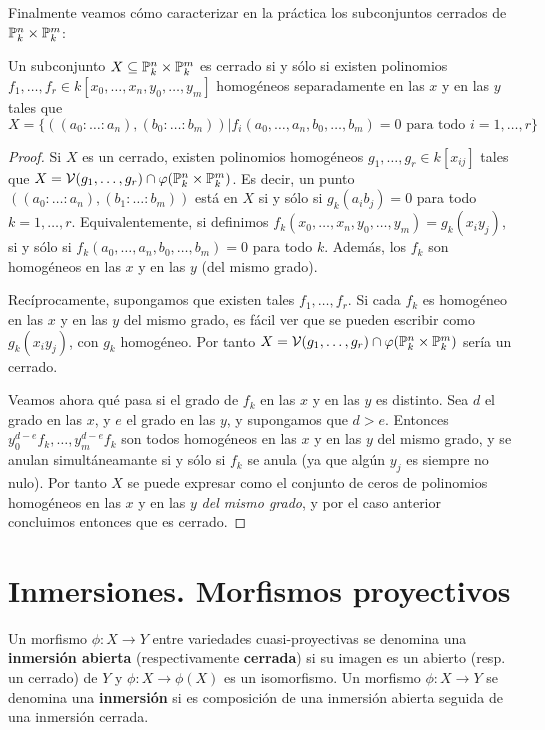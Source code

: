 \documentclass[ACGA.tex]{subfiles}
\begin{document}
Finalmente veamos cómo caracterizar en la práctica los subconjuntos cerrados de $\mathbb{P}^n_k\times\mathbb{P}^m_k$:

\begin{prop}
 Un subconjunto $X\subseteq\mathbb{P}^n_k\times\mathbb{P}^m_k$ es cerrado si y sólo si existen polinomios $f_1,\ldots,f_r\in k[x_0,\ldots,x_n,y_0,\ldots,y_m]$ homogéneos separadamente en las $x$ y en las $y$ tales que 
$$
X=\{((a_0:\ldots:a_n),(b_0:\ldots:b_m))|f_i(a_0,\ldots,a_n,b_0,\ldots,b_m)=0\mbox{ para todo }i=1,\ldots,r\}
$$
\end{prop}

\begin{proof}
Si $X$ es un cerrado, existen polinomios homogéneos $g_1,\ldots,g_r\in k[x_{ij}]$ tales que $X=\mathcal{V}(g_1,\ldots,g_r)\cap \varphi(\mathbb{P}^n_k\times\mathbb{P}^m_k)$. Es decir, un punto $((a_0:\ldots:a_n),(b_1:\ldots:b_m))$ está en $X$ si y sólo si $g_k(a_ib_j)=0$ para todo $k=1,\ldots,r$. Equivalentemente, si definimos $f_k(x_0,\ldots,x_n,y_0,\ldots,y_m)=g_k(x_iy_j)$, si y sólo si $f_k(a_0,\ldots,a_n,b_0,\ldots,b_m)=0$ para todo $k$. Además, los $f_k$ son homogéneos en las $x$ y en las $y$ (del mismo grado).

Recíprocamente, supongamos que existen tales $f_1,\ldots,f_r$. Si cada $f_k$ es homogéneo en las $x$ y en las $y$ del mismo grado, es fácil ver que se pueden escribir como $g_k(x_iy_j)$, con $g_k$ homogéneo. Por tanto $X=\mathcal{V}(g_1,\ldots,g_r)\cap \varphi(\mathbb{P}^n_k\times\mathbb{P}^m_k)$ sería un cerrado.

Veamos ahora qué pasa si el grado de $f_k$ en las $x$ y en las $y$ es distinto. Sea $d$ el grado en las $x$, y $e$ el grado en las $y$, y supongamos que $d>e$. Entonces $y_0^{d-e}f_k,\ldots,y_m^{d-e}f_k$ son todos homogéneos en las $x$ y en las $y$ del mismo grado, y se anulan simultáneamante si y sólo si $f_k$ se anula (ya que algún $y_j$ es siempre no nulo). Por tanto $X$ se puede expresar como el conjunto de ceros de polinomios homogéneos en las $x$ y en las $y$ \emph{del mismo grado}, y por el caso anterior concluimos entonces que es cerrado. 
\end{proof}

\section{Inmersiones. Morfismos proyectivos}

\begin{defi}
 Un morfismo $\phi:X\to Y$ entre variedades cuasi-proyectivas se denomina una {\bf inmersión abierta} (respectivamente {\bf cerrada}) si su imagen es un abierto (resp. un cerrado) de $Y$ y $\phi:X\to\phi(X)$ es un isomorfismo. Un morfismo $\phi:X\to Y$ se denomina una {\bf inmersión} si es composición de una inmersión abierta seguida de una inmersión cerrada.
\end{defi}
\end{document}
